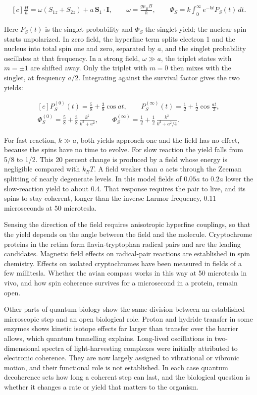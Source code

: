 \documentclass[11pt,oneside]{book}
\newenvironment{centeredalign}{\[\begin{gathered}[c]}{\end{gathered}\]}
\begin{document}
\begin{centeredalign}
\frac{H}{\hbar}=\omega(S_{1z}+S_{2z})+a\,\mathbf S_1\cdot\mathbf I,\qquad \omega=\frac{g\mu_BB}{\hbar},
\qquad \Phi_S=k\int_0^\infty e^{-kt}P_S(t)\,dt.
\end{centeredalign}

Here \(P_S(t)\) is the singlet probability and \(\Phi_S\) the singlet yield; the nuclear spin starts unpolarized. In zero field, the hyperfine term splits electron 1 and the nucleus into total spin one and zero, separated by \(a\), and the singlet probability oscillates at that frequency. In a strong field, \(\omega\gg a\), the triplet states with \(m=\pm1\) are shifted away. Only the triplet with \(m=0\) then mixes with the singlet, at frequency \(a/2\). Integrating against the survival factor gives the two yields:

\begin{centeredalign}
P_S^{(0)}(t)=\tfrac58+\tfrac38\cos at,\qquad P_S^{(\infty)}(t)=\tfrac12+\tfrac12\cos\tfrac{at}{2},\\
\Phi_S^{(0)}=\tfrac58+\tfrac38\,\frac{k^2}{k^2+a^2},\qquad
\Phi_S^{(\infty)}=\tfrac12+\tfrac12\,\frac{k^2}{k^2+a^2/4}.
\end{centeredalign}

For fast reaction, \(k\gg a\), both yields approach one and the field has no effect, because the spins have no time to evolve. For slow reaction the yield falls from 5/8 to 1/2. This 20 percent change is produced by a field whose energy is negligible compared with \(k_BT\). A field weaker than \(a\) acts through the Zeeman splitting of nearly degenerate levels. In this model fields of \(0.05a\) to \(0.2a\) lower the slow-reaction yield to about 0.4. That response requires the pair to live, and its spins to stay coherent, longer than the inverse Larmor frequency, 0.11 microseconds at 50 microtesla.

Sensing the direction of the field requires anisotropic hyperfine couplings, so that the yield depends on the angle between the field and the molecule. Cryptochrome proteins in the retina form flavin-tryptophan radical pairs and are the leading candidates. Magnetic field effects on radical-pair reactions are established in spin chemistry. Effects on isolated cryptochromes have been measured in fields of a few millitesla. Whether the avian compass works in this way at 50 microtesla in vivo, and how spin coherence survives for a microsecond in a protein, remain open.

Other parts of quantum biology show the same division between an established microscopic step and an open biological role. Proton and hydride transfer in some enzymes shows kinetic isotope effects far larger than transfer over the barrier allows, which quantum tunnelling explains. Long-lived oscillations in two-dimensional spectra of light-harvesting complexes were initially attributed to electronic coherence. They are now largely assigned to vibrational or vibronic motion, and their functional role is not established. In each case quantum decoherence sets how long a coherent step can last, and the biological question is whether it changes a rate or yield that matters to the organism.
\end{document}
